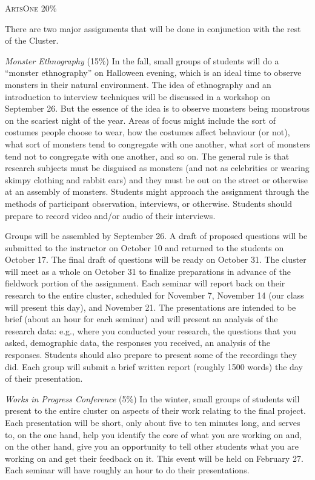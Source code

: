 \documentclass[12pt]{article}
\begin{document}
{\large \textsc{ArtsOne 20\%}}

There are two major assignments that will be done in conjunction with the rest of the Cluster. 

\textit{Monster Ethnography} (15\%) In the fall, small groups of students will do a ``monster ethnography'' on Halloween evening, which is an ideal time to observe monsters in their natural environment. The idea of ethnography and an introduction to interview techniques will be discussed in a workshop on September 26. But the essence of the idea is to observe monsters being monstrous on the scariest night of the year. Areas of focus might include the sort of costumes people choose to wear, how the costumes affect behaviour (or not), what sort of monsters tend to congregate with one another, what sort of monsters tend not to congregate with one another, and so on. The general rule is that research subjects must be disguised as monsters (and not as celebrities or wearing skimpy clothing and rabbit ears) and they must be out on the street or otherwise at an assembly of monsters. Students might approach the assignment through the methods of participant observation, interviews, or otherwise. Students should prepare to record video and/or audio of their interviews.

Groups will be assembled by September 26. A draft of proposed questions will be submitted to the instructor on October 10 and returned to the students on October 17. The final draft of questions will be ready on October 31. The cluster will meet as a whole on October 31 to finalize preparations in advance of the fieldwork portion of the assignment. Each seminar will report back on their research to the entire cluster, scheduled for November 7, November 14 (our class will present this day), and November 21. The presentations are intended to be brief (about an hour for each seminar) and will present an analysis of the research data: e.g., where you conducted your research, the questions that you asked, demographic data, the responses you received, an analysis of the responses. Students should also prepare to present some of the recordings they did. Each group will submit a brief written report (roughly 1500 words) the day of their presentation.

\textit{Works in Progress Conference} (5\%) In the winter, small groups of students will present to the entire cluster on aspects of their work relating to the final project. Each presentation will be short, only about five to ten minutes long, and serves to, on the one hand, help you identify the core of what you are working on and, on the other hand, give you an opportunity to tell other students what you are working on and get their feedback on it. This event will be held on February 27. Each seminar will have roughly an hour to do their presentations.
\end{document}
